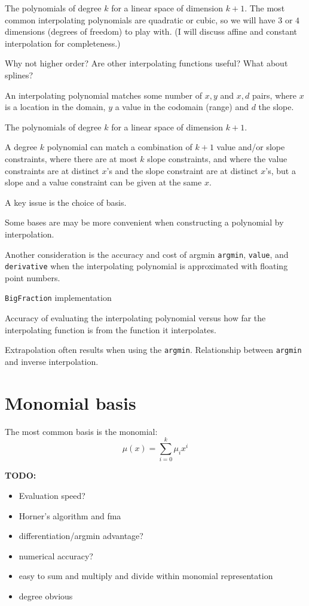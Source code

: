 The polynomials of degree $k$ for a linear space of dimension
$k+1$\cite{wiki:polynomial}.
The most common interpolating polynomials are quadratic or cubic,
so we will have $3$ or $4$ dimensions (degrees of freedom) to play
with. 
(I will discuss affine and constant interpolation for 
completeness.)

Why not higher order? Are other interpolating functions useful?
What about splines?

An interpolating polynomial matches some number of $x,y$
and $x,d$ pairs, where $x$ is a location in the domain,
$y$ a value in the codomain (range) and $d$ the slope.

The polynomials of degree $k$ for a linear space of dimension
$k+1$. 

A degree $k$ polynomial can match a combination of $k+1$ value 
and/or 
slope constraints, where there are at most $k$ slope constraints,
and where the value constraints are at distinct $x$'s and the
slope constraint are at distinct $x$'s, but a slope and a value 
constraint can be given at the same $x$.

A key issue is the choice of basis.

Some bases are may be more convenient when constructing a 
polynomial by interpolation.

Another consideration is the accuracy and cost of 
argmin \texttt{argmin}, \texttt{value}, and \texttt{derivative} 
when the interpolating polynomial is approximated with 
floating point numbers.

\texttt{BigFraction} implementation

Accuracy of evaluating the interpolating polynomial
versus how far the interpolating function is from the function it
interpolates.

Extrapolation often results when using the \texttt{argmin}.
Relationship between \texttt{argmin} and inverse interpolation.

\section{Monomial basis}\label{sec:Monomial-basis}

The most common basis is the monomial:
\begin{equation}
\mu(x) = \sum_{i=0}^{k} \mu_i x^i
\end{equation}

\textbf{TODO:} 
\begin{itemize}
  \item Evaluation speed?
  \item Horner's algorithm and fma
  \item differentiation/argmin advantage?
  \item numerical accuracy?
  \item easy to sum and multiply and divide within monomial
  representation
  \item degree obvious
\end{itemize}

